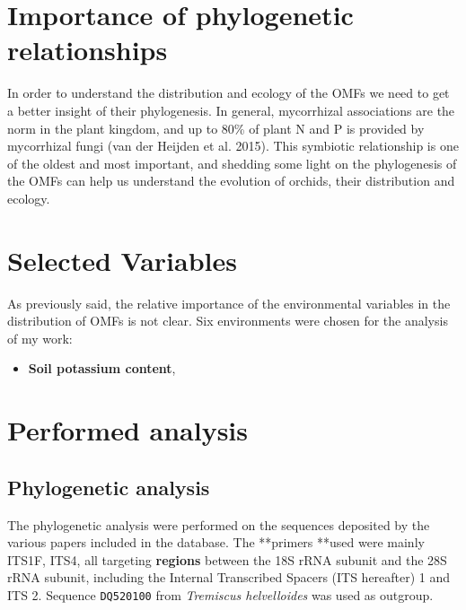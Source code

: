 \chapter{Importance of phylogenetic relationships}
\label{importanceofphylogeneticrelationships}

In order to understand the distribution and ecology of the OMFs we need to get a better insight of their phylogenesis. In general, mycorrhizal associations are the norm in the plant kingdom, and up to 80\% of plant N and P is provided by mycorrhizal fungi (van der Heijden et al. 2015). This symbiotic relationship is one of the oldest and most important, and shedding some light on the phylogenesis of the OMFs can help us understand the evolution of orchids, their distribution and ecology.

\chapter{Selected Variables}
\label{selectedvariables}

As previously said, the relative importance of the environmental variables in the distribution of OMFs is not clear. Six environments were chosen for the analysis of my work:

\begin{itemize}
\item \textbf{Soil potassium content},

\end{itemize}

\chapter{Performed analysis}
\label{performedanalysis}

\section{Phylogenetic analysis}
\label{phylogeneticanalysis}

The phylogenetic analysis were performed on the sequences deposited by the various papers included in the database.
The **primers **used were mainly ITS1F, ITS4, all targeting \textbf{regions} between the 18S rRNA subunit and the 28S rRNA subunit, including the Internal Transcribed Spacers (ITS hereafter) 1 and ITS 2.
Sequence \texttt{DQ520100} from \emph{Tremiscus helvelloides} was used as outgroup.


